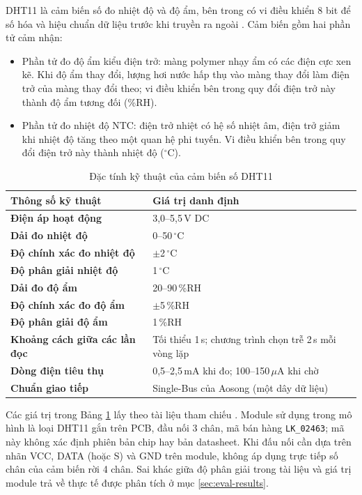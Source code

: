 DHT11 là cảm biến số đo nhiệt độ và độ ẩm, bên trong có vi điều khiển 8 bit để số hóa và hiệu chuẩn dữ liệu trước khi truyền ra ngoài \cite{dht11-datasheet}. Cảm biến gồm hai phần tử cảm nhận:
\begin{itemize}[leftmargin=1.2cm]
    \item Phần tử đo độ ẩm kiểu điện trở: màng polymer nhạy ẩm có các điện cực xen kẽ. Khi độ ẩm thay đổi, lượng hơi nước hấp thụ vào màng thay đổi làm điện trở của màng thay đổi theo; vi điều khiển bên trong quy đổi điện trở này thành độ ẩm tương đối (\%RH).
    \item Phần tử đo nhiệt độ NTC: điện trở nhiệt có hệ số nhiệt âm, điện trở giảm khi nhiệt độ tăng theo một quan hệ phi tuyến. Vi điều khiển bên trong quy đổi điện trở này thành nhiệt độ ($^\circ$C).
\end{itemize}

\begin{table}[H]
\centering
\small
\caption{Đặc tính kỹ thuật của cảm biến số DHT11}
\label{tab:dht11-specs}
\begin{tabularx}{\textwidth}{>{\bfseries}p{5.0cm}X}
\toprule
Thông số kỹ thuật & Giá trị danh định \\
\midrule
Điện áp hoạt động & 3,0--5,5\,V DC \\
Dải đo nhiệt độ & 0--50\,$^\circ$C \\
Độ chính xác đo nhiệt độ & $\pm$2\,$^\circ$C \\
Độ phân giải nhiệt độ & 1\,$^\circ$C \\
Dải đo độ ẩm & 20--90\,\%RH \\
Độ chính xác đo độ ẩm & $\pm$5\,\%RH \\
Độ phân giải độ ẩm & 1\,\%RH \\
Khoảng cách giữa các lần đọc & Tối thiểu 1\,s; chương trình chọn trễ 2\,s mỗi vòng lặp \\
Dòng điện tiêu thụ & 0,5--2,5\,mA khi đo; 100--150\,$\mu$A khi chờ \\
Chuẩn giao tiếp & Single-Bus của Aosong (một dây dữ liệu) \\
\bottomrule
\end{tabularx}
\end{table}

Các giá trị trong Bảng \ref{tab:dht11-specs} lấy theo tài liệu tham chiếu \cite{dht11-datasheet}. Module sử dụng trong mô hình là loại DHT11 gắn trên PCB, đầu nối 3 chân, mã bán hàng \texttt{LK\_02463}; mã này không xác định phiên bản chip hay bản datasheet. Khi đấu nối cần dựa trên nhãn VCC, DATA (hoặc S) và GND trên module, không áp dụng trực tiếp số chân của cảm biến rời 4 chân. Sai khác giữa độ phân giải trong tài liệu và giá trị module trả về thực tế được phân tích ở mục \ref{sec:eval-results}.

